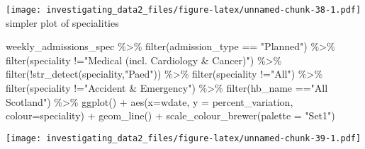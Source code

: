 \documentclass[
]{article}
\newenvironment{Shaded}{\begin{snugshade}}{\end{snugshade}}
\newcommand{\AttributeTok}[1]{\textcolor[rgb]{0.77,0.63,0.00}{#1}}
\newcommand{\FunctionTok}[1]{\textcolor[rgb]{0.00,0.00,0.00}{#1}}
\newcommand{\NormalTok}[1]{#1}
\newcommand{\SpecialCharTok}[1]{\textcolor[rgb]{0.00,0.00,0.00}{#1}}
\newcommand{\StringTok}[1]{\textcolor[rgb]{0.31,0.60,0.02}{#1}}
\begin{document}
\texttt{[image: investigating\_data2\_files/figure-latex/unnamed-chunk-38-1.pdf]}
simpler plot of specialities

\begin{Shaded}
\begin{Highlighting}[]
\NormalTok{weekly\_admissions\_spec }\SpecialCharTok{\%\textgreater{}\%} 
  \FunctionTok{filter}\NormalTok{(admission\_type }\SpecialCharTok{==} \StringTok{"Planned"}\NormalTok{) }\SpecialCharTok{\%\textgreater{}\%} 
  \FunctionTok{filter}\NormalTok{(speciality }\SpecialCharTok{!=}\StringTok{"Medical (incl. Cardiology \& Cancer)"}\NormalTok{) }\SpecialCharTok{\%\textgreater{}\%} 
  \FunctionTok{filter}\NormalTok{(}\SpecialCharTok{!}\FunctionTok{str\_detect}\NormalTok{(speciality,}\StringTok{"Paed"}\NormalTok{)) }\SpecialCharTok{\%\textgreater{}\%} 
  \FunctionTok{filter}\NormalTok{(speciality }\SpecialCharTok{!=}\StringTok{"All"}\NormalTok{) }\SpecialCharTok{\%\textgreater{}\%} 
  \FunctionTok{filter}\NormalTok{(speciality }\SpecialCharTok{!=}\StringTok{"Accident \& Emergency"}\NormalTok{) }\SpecialCharTok{\%\textgreater{}\%} 
  \FunctionTok{filter}\NormalTok{(hb\_name }\SpecialCharTok{==}\StringTok{"All Scotland"}\NormalTok{) }\SpecialCharTok{\%\textgreater{}\%} 
\FunctionTok{ggplot}\NormalTok{() }\SpecialCharTok{+}
\FunctionTok{aes}\NormalTok{(}\AttributeTok{x=}\NormalTok{wdate, }\AttributeTok{y =}\NormalTok{ percent\_variation, }\AttributeTok{colour=}\NormalTok{speciality) }\SpecialCharTok{+}
\FunctionTok{geom\_line}\NormalTok{() }\SpecialCharTok{+}
\FunctionTok{scale\_colour\_brewer}\NormalTok{(}\AttributeTok{palette =} \StringTok{"Set1"}\NormalTok{) }
\end{Highlighting}
\end{Shaded}

\texttt{[image: investigating\_data2\_files/figure-latex/unnamed-chunk-39-1.pdf]}
\end{document}
